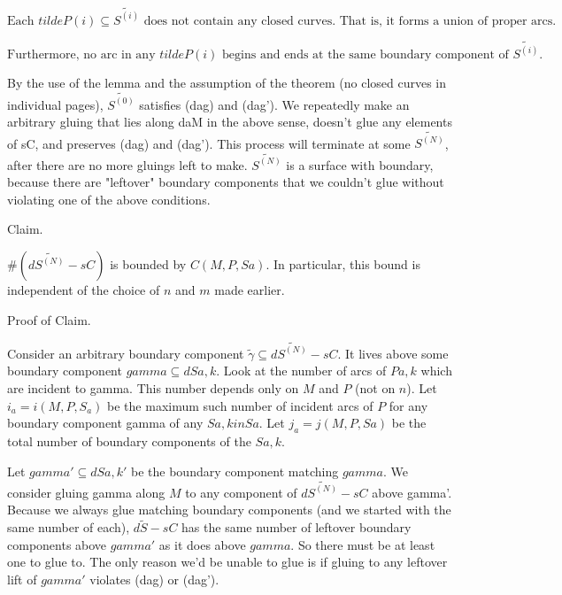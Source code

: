 \documentclass[12pt]{amsart}
\theoremstyle{definition}
\theoremstyle{remark}
\newcommand{\cin}{\subseteq}
\begin{document}

\begin{equation}\label{E:dag}
\text{
 Each $tildeP(i) \cin
\widetilde{S^{(i)}}$ does not contain any closed curves. That is, it forms
a union of proper arcs.
}
\tag{\dag}
\end{equation}

\begin{equation}\label{E:dag'}
\text{
Furthermore, no arc in any $tildeP(i)$ begins and ends at the same
boundary component of $\widetilde{S^{(i)}}$.
}
\tag{\ddag}
\end{equation}


By the use of the lemma and the assumption of the theorem (no closed curves in
individual pages), $\widetilde{S^{(0)}}$ satisfies (dag) and (dag'). We repeatedly make
an arbitrary gluing that lies along daM in the above sense, doesn't glue any
elements of sC, and preserves (dag) and (dag').  This process will terminate at
some $\widetilde{S^{(N)}}$, after there are no more gluings left to make. $\widetilde{S^{(N)}}$ is
a surface with boundary, because there are "leftover" boundary components that
we couldn't glue without violating one of the above conditions.

Claim.

$\#(d\widetilde{S^{(N)}} - sC)$ is bounded by $C(M,P,Sa)$.  In particular, this bound is
independent of the choice of $n$ and $m$ made earlier.

Proof of Claim.

Consider an arbitrary boundary component $\widetilde{\gamma} \cin d\widetilde{S^{(N)}} - sC$.  It
lives above some boundary component $gamma \cin dSa,k$. Look at the number of
arcs of $Pa,k$ which are incident to gamma. This number depends only on $M$ and
$P$ (not on $n$). Let $i_a = i(M,P,S_a)$ be the maximum such number of incident
arcs of $P$ for any boundary component gamma of any $Sa,k in Sa$. Let $j_a
= j(M,P,Sa)$ be the total number of boundary components of the $Sa,k$.

Let $gamma' \cin dSa,k'$ be the boundary component matching $gamma$. We consider
gluing gamma along $M$ to any component of $d\widetilde{S^{(N)}} - sC$ above gamma'.
Because we always glue matching boundary components (and we started with the
same number of each), $d\widetilde{S} - sC$ has the same number of leftover boundary
components above $gamma'$ as it does above $gamma$. So there must be at least
one to glue to.  The only reason we'd be unable to glue is if gluing to any
leftover lift of $gamma'$ violates (dag) or (dag').
\end{document}
